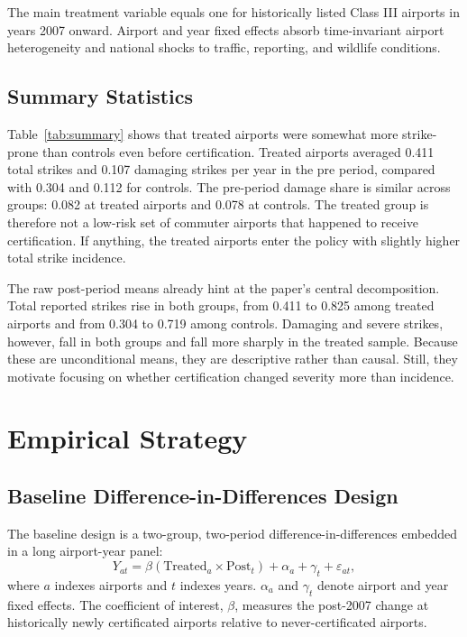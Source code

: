 \documentclass[12pt]{article}
\begin{document}
The main treatment variable equals one for historically listed Class III airports in years 2007 onward. Airport and year fixed effects absorb time-invariant airport heterogeneity and national shocks to traffic, reporting, and wildlife conditions.

\subsection{Summary Statistics}



Table~\ref{tab:summary} shows that treated airports were somewhat more strike-prone than controls even before certification. Treated airports averaged 0.411 total strikes and 0.107 damaging strikes per year in the pre period, compared with 0.304 and 0.112 for controls. The pre-period damage share is similar across groups: 0.082 at treated airports and 0.078 at controls. The treated group is therefore not a low-risk set of commuter airports that happened to receive certification. If anything, the treated airports enter the policy with slightly higher total strike incidence.

The raw post-period means already hint at the paper's central decomposition. Total reported strikes rise in both groups, from 0.411 to 0.825 among treated airports and from 0.304 to 0.719 among controls. Damaging and severe strikes, however, fall in both groups and fall more sharply in the treated sample. Because these are unconditional means, they are descriptive rather than causal. Still, they motivate focusing on whether certification changed severity more than incidence.

\section{Empirical Strategy}

\subsection{Baseline Difference-in-Differences Design}

The baseline design is a two-group, two-period difference-in-differences embedded in a long airport-year panel:
\begin{equation}
Y_{at} = \beta (\text{Treated}_a \times \text{Post}_t) + \alpha_a + \gamma_t + \varepsilon_{at},
\end{equation}
where $a$ indexes airports and $t$ indexes years. $\alpha_a$ and $\gamma_t$ denote airport and year fixed effects. The coefficient of interest, $\beta$, measures the post-2007 change at historically newly certificated airports relative to never-certificated airports.
\end{document}
